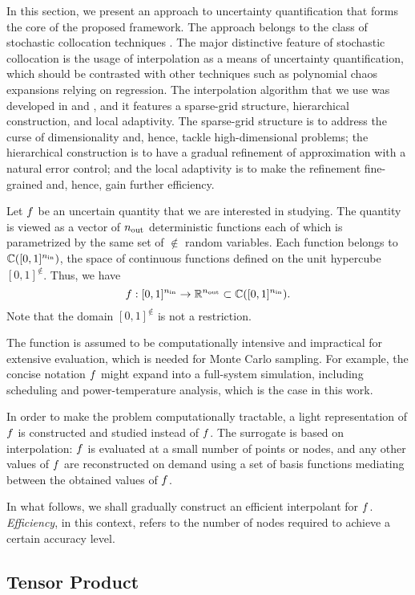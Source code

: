 In this section, we present an approach to uncertainty quantification that forms
the core of the proposed framework. The approach belongs to the class of
stochastic collocation techniques \cite{xiu2010}. The major distinctive feature
of stochastic collocation is the usage of interpolation as a means of
uncertainty quantification, which should be contrasted with other techniques
such as polynomial chaos expansions relying on regression. The interpolation
algorithm that we use was developed in \cite{klimke2006} and \cite{ma2009}, and
it features a sparse-grid structure, hierarchical construction, and local
adaptivity. The sparse-grid structure is to address the curse of dimensionality
and, hence, tackle high-dimensional problems; the hierarchical construction is
to have a gradual refinement of approximation with a natural error control;
and the local adaptivity is to make the refinement fine-grained and, hence, gain
further efficiency.

Let $f$ be an uncertain quantity that we are interested in studying. The
quantity is viewed as a vector of ${n_\text{out}}$ deterministic functions each of which
is parametrized by the same set of $\nin$ random variables. Each function
belongs to $\mathbb{C}([0, 1]^{n_\text{in}})$, the space of continuous functions defined
on the unit hypercube $[0, 1]^\nin$. Thus, we have
\[
  f: [0, 1]^{n_\text{in}} \to \mathbb{R}^{n_\text{out}} \subset \mathbb{C}([0, 1]^{n_\text{in}}).
\]
Note that the domain $[0, 1]^\nin$ is not a restriction.

The function is assumed to be computationally intensive and impractical for
extensive evaluation, which is needed for Monte Carlo sampling. For example, the
concise notation $f$ might expand into a full-system simulation, including
scheduling and power-temperature analysis, which is the case in this work.

In order to make the problem computationally tractable, a light representation
of $f$ is constructed and studied instead of $f$. The surrogate is based on
interpolation: $f$ is evaluated at a small number of points or nodes, and any
other values of $f$ are reconstructed on demand using a set of basis functions
mediating between the obtained values of $f$.

In what follows, we shall gradually construct an efficient interpolant for $f$.
\emph{Efficiency}, in this context, refers to the number of nodes required to
achieve a certain accuracy level.

\subsection{Tensor Product}


